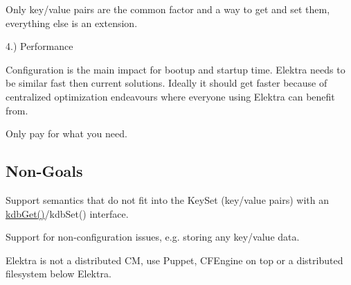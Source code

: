 Only key/value pairs are the common factor and a way to get and set them, everything else is an extension.

4.) Performance

Configuration is the main impact for bootup and startup time. Elektra needs to be similar fast then current solutions. Ideally it should get faster because of centralized optimization endeavours where everyone using Elektra can benefit from.

Only pay for what you need.

\subsection*{Non-\/\+Goals}


\begin{DoxyItemize}
\item Support semantics that do not fit into the Key\+Set (key/value pairs) with an \hyperlink{group__kdb_ga28e385fd9cb7ccfe0b2f1ed2f62453a1}{kdb\+Get()}/kdb\+Set() interface.
\item Support for non-\/configuration issues, e.\+g. storing any key/value data.
\item Elektra is not a distributed C\+M, use Puppet, C\+F\+Engine on top or a distributed filesystem below Elektra. 
\end{DoxyItemize}